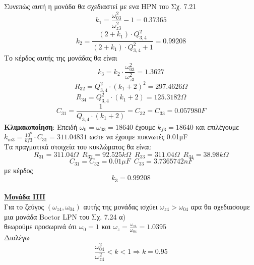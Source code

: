 \documentclass{article}
\begin{document}
{\begin{center}
\end{center}
Συνεπώς αυτή η μονάδα θα σχεδιαστεί με ενα HPN του Σχ. 7.21 
\begin{equation*}
k_1 = \frac{ω_{03}^2}{ω_{z3}^2} -1 = 0.37365
\end{equation*}
\begin{equation*}
k_2  = \frac{(2+k_1) \cdot Q_{3,4}^2}{(2+k_1) \cdot Q_{3,4}^2 +1} = 0.99208
\end{equation*}
Το κέρδος αυτής της μονάδας θα είναι
\begin{equation*}
k_3 = k_2 \cdot \frac{ω_{03}^2}{ω_{z3}^2} =  1.3627
\end{equation*}
\begin{equation*}
R_{32} = Q_{3,4}^2 \cdot (k_1+2)^2 = 297.4626 Ω
\end{equation*}
\begin{equation*}
R_{34} = Q_{3,4}^2 \cdot (k_1+2) = 125.3182 Ω
\end{equation*}
\begin{equation*}
C_{31} = \frac{1}{Q_{3,4} \cdot (k_1+2)}= C_{32} = C_{33} =  0.057980 F 
\end{equation*}
\textbf{Κλιμακοποίηση}: Eπειδή $ω_0 = ω_{03} = 18640$ έχουμε $k_{f3} = 18640$ και επιλέγουμε $k_{m3} = \frac{10^8}{kf3} \cdot C_{31} =  311.04831$ ωστε να έχουμε πυκνωτές 0.01μF 
\\Τα πραγματικά στοιχεία του κυκλώματος θα είναι:
\begin{equation*}
\boxed{R_{31}= 311.04 Ω} \enspace \boxed{R_{32}= 92.525 kΩ} \enspace \boxed{R_{33}= 311.04 Ω} 
\enspace \boxed{R_{34}= 38.98 kΩ} 
\end{equation*} 
\begin{equation*}
\boxed{C_{31} = C_{32} = 0.01 μF} \enspace \boxed{C_{33}= 3.7365742 nF}
\end{equation*}
με κέρδος
\begin{equation*}
\boxed{k_3 = 0.99208}
\end{equation*}
\\
\large{ \underline{\textbf{Μονάδα IIIΙ}} \\[0.4\baselineskip]}
\large{}
Για το ζεύγος $(ω_{z4},ω_{04})$ αυτής της μονάδας ισχύει $\boxed{ω_{z4}>ω_{04}}$ αρα θα σχεδιασουμε μια μονάδα Boctor LPN του Σχ. 7.24 α) \\
θεωρούμε προσωρινά ότι $ω_0=1$ και $ω_z = \frac{ω_{z4}}{ω_{04}} = 1.0395$ \\
Διαλέγω 
\begin{equation*}
\frac{ω_{04}^2}{ω_{z4}^2}<k<1 \Rightarrow \boxed{k=0.95}
\end{equation*}
}
\end{document}
